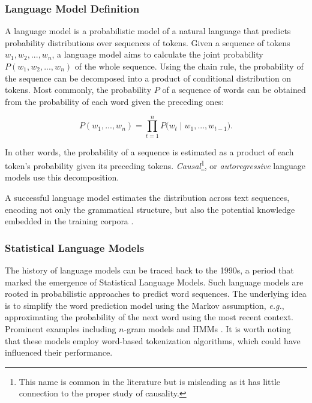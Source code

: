 \subsubsection{Language Model Definition}


A language model is a probabilistic model of a natural language that predicts probability distributions over sequences of tokens. Given a sequence of tokens $w_1, w_2, ..., w_n$, a language model aims to calculate the joint probability $P(w_1, w_2, ..., w_n)$ of the whole sequence. Using the chain rule, the probability of the sequence can be decomposed into a product of conditional distribution on tokens. Most commonly, the probability $P$ of a sequence of words can be obtained from the probability of each word given the preceding ones:

\begin{equation}
    P(w_1, ..., w_n) = \prod_{t=1}^{n} P\bigl(w_t \mid w_1, ..., w_{t-1}\bigr).
\label{equation:causal-distribution}
\end{equation}

In other words, the probability of a sequence is estimated as a product of each token's probability given its preceding tokens. \textit{Causal}\footnote{This name is common in the literature but is misleading as it has little connection to the proper study of causality.}, or \textit{autoregressive} language models use this decomposition.

A successful language model estimates the distribution across text sequences, encoding not only the grammatical structure, but also the potential knowledge embedded in the training corpora \citep{jozefowicz2016exploring}.

\subsubsection{Statistical Language Models} The history of language models can be traced back to the 1990s, a period that marked the emergence of Statistical Language Models. Such language models are rooted in probabilistic approaches to predict word sequences. The underlying idea is to simplify the word prediction model using the Markov assumption, \textit{e.g.}, approximating the probability of the next word using the most recent context. Prominent examples including $n$-gram models \citep{brown1992class, omar2018arabic} and \acp{HMM} \citep{petrushin2000hidden}. It is worth noting that these models employ word-based tokenization algorithms, which could have influenced their performance.


